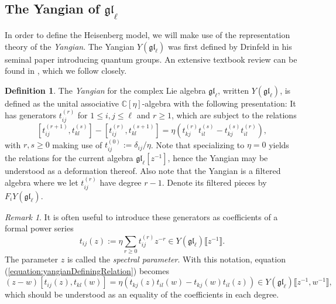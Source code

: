 \documentclass[11pt]{report}
\theoremstyle{definition}
\newtheorem{definition}[theorem]{Definition}
\theoremstyle{remark}
\newtheorem*{remark}{Remark}
\theoremstyle{remark}
\newcommand{\C}{\mathbb{C}}
\begin{document}
\subsection{The Yangian of $\mathfrak{gl}_\ell$}

In order to define the Heisenberg model, we will make use of the representation theory of the \emph{Yangian}. The Yangian $Y(\mathfrak{gl}_\ell)$ was first defined by Drinfeld in his seminal paper \cite{article:drinfeld:1985} introducing quantum groups. An extensive textbook review can be found in \cite{book:molev}, which we follow closely.

\begin{definition}
The \emph{Yangian} for the complex Lie algebra $\mathfrak{gl}_\ell$, written $Y(\mathfrak{gl}_\ell)$, is defined as the unital associative $\C[\eta]$-algebra with the following presentation: It has generators $t_{ij}^{(r)}$ for $1 \leq i,j \leq \ell$ and $r \geq 1$, which are subject to the relations
\begin{equation}\label{equation:yangianDefiningRelation}
[t_{ij}^{(r+1)},t_{kl}^{(s)}] - [t_{ij}^{(r)},t_{kl}^{(s+1)}] = \eta(t_{kj}^{(r)} t_{il}^{(s)} - t_{kj}^{(s)} t_{il}^{(r)}),
\end{equation}
with $r,s \geq 0$ making use of $t_{ij}^{(0)} := \delta_{ij}/\eta$. Note that specializing to $\eta = 0$ yields the relations for the current algebra $\mathfrak{gl}_\ell[z^{-1}]$, hence the Yangian may be understood as a deformation thereof. Also note that the Yangian is a filtered algebra where we let $t_{ij}^{(r)}$ have degree $r-1$. Denote its filtered pieces by $F_i Y(\mathfrak{gl}_\ell)$.
\end{definition}

\begin{remark}
It is often useful to introduce these generators as coefficients of a formal power series
\begin{equation*}
t_{ij}(z) := \eta \sum_{r \geq 0} t_{ij}^{(r)} z^{-r} \in Y(\mathfrak{gl}_\ell)\llbracket z^{-1} \rrbracket.
\end{equation*}
The parameter $z$ is called the \emph{spectral parameter}. With this notation, equation (\ref{equation:yangianDefiningRelation}) becomes
\begin{equation}\label{equation:yangianDefiningRelationUV}
(z-w) [t_{ij}(z),t_{kl}(w)] = \eta(t_{kj}(z) t_{il}(w) - t_{kj}(w) t_{il}(z)) \in Y(\mathfrak{gl}_\ell)\llbracket z^{-1},w^{-1} \rrbracket,
\end{equation}
which should be understood as an equality of the coefficients in each degree.
\end{remark}
\end{document}
